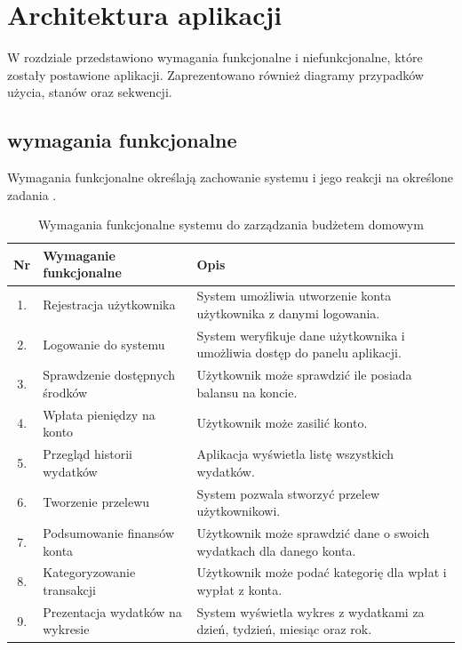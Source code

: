 \chapter{Architektura aplikacji}
W rozdziale przedstawiono wymagania funkcjonalne i niefunkcjonalne, które zostały postawione aplikacji. Zaprezentowano również diagramy przypadków użycia, stanów oraz sekwencji.
\section{wymagania funkcjonalne}
Wymagania funkcjonalne określają zachowanie systemu i jego reakcji na określone zadania \cite{Wymagania}.
\begin{table}[!h]
	\centering
	\renewcommand{\arraystretch}{1.3}
	\setlength{\tabcolsep}{6pt}
	\begin{tabular}{|c|p{5cm}|p{8cm}|}
		\hline
		\textbf{Nr} & \textbf{Wymaganie funkcjonalne} & \textbf{Opis} \\ \hline
		
		1. & Rejestracja użytkownika & System umożliwia utworzenie konta użytkownika z danymi logowania. \\ \hline
		2. & Logowanie do systemu & System weryfikuje dane użytkownika i umożliwia dostęp do panelu aplikacji. \\ \hline
		3. & Sprawdzenie dostępnych środków & Użytkownik może sprawdzić ile posiada balansu na koncie. \\ \hline
		4. & Wpłata pieniędzy na konto & Użytkownik może zasilić konto. \\ \hline
		5. & Przegląd historii wydatków & Aplikacja wyświetla listę wszystkich wydatków. \\ \hline
		6. & Tworzenie przelewu & System pozwala stworzyć przelew użytkownikowi. \\ \hline
		7. & Podsumowanie finansów konta & Użytkownik może sprawdzić dane o swoich wydatkach dla danego konta. \\ \hline
		8. & Kategoryzowanie transakcji & Użytkownik może podać kategorię dla wpłat i wypłat z konta. \\ \hline
		9. & Prezentacja wydatków na wykresie & System wyświetla wykres z wydatkami za dzień, tydzień, miesiąc oraz rok. \\ \hline
	\end{tabular}
	\caption{Wymagania funkcjonalne systemu do zarządzania budżetem domowym}
	\label{tab:wymagania_funkcjonalne}
\end{table}

